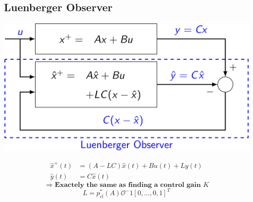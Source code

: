 \subsection{Luenberger Observer}
    \centerline{\includegraphics[width=0.8\linewidth]{src/4_state_estimation/images/luenberger_observer.jpeg}}
    \vspace*{-1em}
    \begin{align*}
        \hat{x}^+(t) &= (A-LC)\hat{x}(t) + Bu(t) + Ly(t)\\
        \hat{y}(t) &= C\hat{x}(t)
    \end{align*}
    $$
    \Rightarrow \textbf{Exactely the same as finding a control gain $K$}
    $$
    $$
    L = p_{cl}^*(A)\mathcal{O}^-1[0, \hdots, 0, 1]^T
    $$